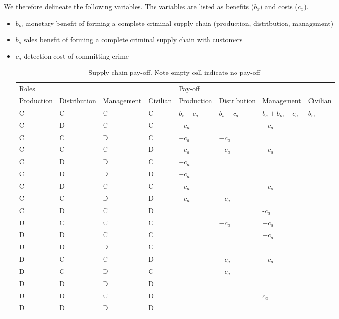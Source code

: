 \documentclass[a4paper, 11pt, twocolumn]{article}
\begin{document}
We   therefore  delineate   the  following   variables.  The
variables are listed as benefits (\(b_x\)) and costs (\(c_x\)).
\begin{itemize}
\item \(b_m\)  monetary benefit  of  forming  a complete  criminal
supply chain (production, distribution, management)
\item \(b_s\) sales benefit of  forming a complete criminal supply
chain with customers
\item \(c_a\) detection cost of committing crime

\begin{table}[htbp]
\caption{Supply chain pay-off. Note empty cell indicate no pay-off.}
\centering
\begin{tabular}{llllllll}
Roles &  &  &  & Pay-off &  &  & \\[0pt]
Production & Distribution & Management & Civilian & Production & Distribution & Management & Civilian\\[0pt]
\hline
C & C & C & C & \(b_s -c_a\) & \(b_s -c_a\) & \(b_s + b_m - c_a\) & \(b_m\)\\[0pt]
C & D & C & C & \(-c_a\) &  & \(-c_a\) & \\[0pt]
C & C & D & C & \(-c_a\) & \(-c_a\) &  & \\[0pt]
C & C & C & D & \(-c_a\) & \(-c_a\) & \(-c_a\) & \\[0pt]
C & D & D & C & \(-c_a\) &  &  & \\[0pt]
C & D & D & D & \(-c_a\) &  &  & \\[0pt]
C & D & C & C & \(-c_a\) &  & \(-c_s\) & \\[0pt]
C & C & D & D & \(-c_a\) & \(-c_a\) &  & \\[0pt]
C & D & C & D &  &  & -\(c_a\) & \\[0pt]
D & C & C & C &  & \(-c_a\) & \(-c_a\) & \\[0pt]
D & D & C & C &  &  & \(-c_a\) & \\[0pt]
D & D & D & C &  &  &  & \\[0pt]
D & C & C & D &  & \(-c_a\) & \(-c_a\) & \\[0pt]
D & C & D & C &  & \(-c_a\) &  & \\[0pt]
D & D & D & D &  &  &  & \\[0pt]
D & D & C & D &  &  & \(c_a\) & \\[0pt]
D & D & D & D &  &  &  & \\[0pt]
\end{tabular}
\end{table}
\end{itemize}
\end{document}
